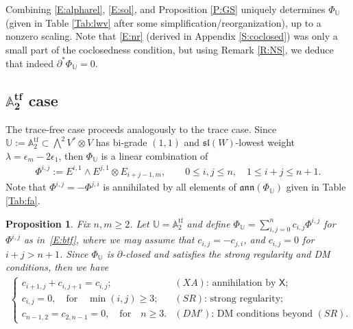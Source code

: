 \documentclass[10pt,a4paper]{amsart}
\newcommand\tensor{\otimes}
\DeclareMathOperator{\tf}{tf}
\newcommand\fann{\mathfrak{ann}}
\newcommand\fsl{\mathfrak{sl}}
\newcommand\bbU{\mathbb{U}}
\newcommand\bbA{\mathbb{A}}
\newcommand\sfX{\mathsf{X}}
\numberwithin{equation}{section}
\newtheorem{Proposition}[Theorem]{Proposition}
 { \theoremstyle{definition}
\newtheorem{Definition}[Theorem]{Definition}
\newtheorem{Note}[Theorem]{Note}
\newtheorem{Example}[Theorem]{Example}
\newtheorem{Remark}[Theorem]{Remark} }
\begin{document}
Combining \eqref{E:alpharel}, \eqref{E:sol}, and Proposition \ref{P:GS} uniquely determines $\Phi_{\bbU}$ (given in Table \ref{Tab:lwv} after some simplification/reorganization), up to a nonzero scaling. Note that \eqref{E:nr} (derived in Appendix \ref{S:coclosed}) was only a small part of the coclosedness condition, but using Remark \ref{R:NS}, we deduce that indeed $\partial^*\Phi_{\bbU} = 0$.

\subsection[A\_2\^{}\{tf\} case]{$\boldsymbol{\bbA_2^{\tf}}$ case} The trace-free case proceeds analogously to the trace case. Since $\bbU := \bbA_2^{\tf} \subset \bigwedge^2 V^* \otimes V$ has bi-grade $(1,1)$ and $\fsl(W)$-lowest weight $\lambda =\epsilon_m -2\epsilon_1$, then $\Phi_\bbU$ is a linear combination of
\begin{align}\label{E:btf}
\Phi^{i,j} := E^{i,1} \wedge E^{j,1} \tensor E_{i+j-1,m}, \qquad 0 \le i,j \le n,\quad 1 \le i+j \le n+1.
\end{align}
Note that $\Phi^{i,j} = -\Phi^{j,i}$ is annihilated by all elements of $\fann(\Phi_\bbU)$ given in Table \ref{Tab:fa}.

\begin{Proposition}\label{P:GS1} Fix $n,m \geq 2$.
Let $\bbU = \bbA_2^{\tf}$ and define $\Phi_\bbU = \sum_{i,j=0}^n c_{i,j} \Phi^{i,j}$ for $\Phi^{i,j}$ as in~\eqref{E:btf}, where we may assume that $c_{i,j} = -c_{j,i}$, and $c_{i,j} =0$ for $i+j>n+1$. Since $\Phi_\bbU$ is $\partial$-closed and satisfies the strong regularity and DM conditions, then we have
\begin{align}\label{E:GStf}
\begin{cases}
c_{i+1,j} + c_{i,j+1} = c_{i,j};& \text{$(XA)$: annihilation by $\sfX$;}\\
c_{i,j}{}= 0,\quad \text{for}\quad \min(i,j)\ge 3;&\text{$(SR)$: strong regularity;}\\
c_{n-1,2}=c_{2,n-1}= 0,\quad \text{for}\quad n\ge 3. & \text{$(DM')$: DM conditions beyond $(SR)$.}
\end{cases}
\end{align}
\end{Proposition}
\end{document}
